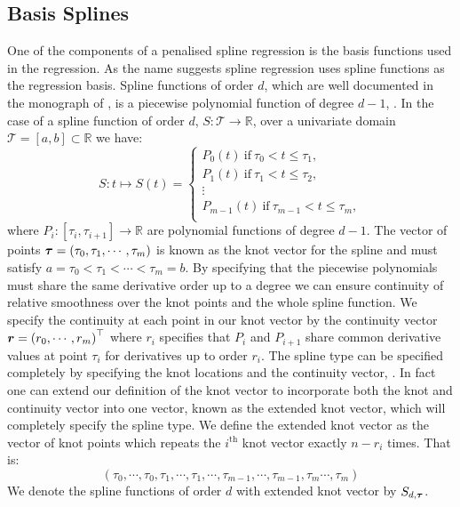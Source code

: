  \subsection{Basis Splines  \label{ssec:basis_splines}}
 One of the components of a penalised spline regression is the basis functions used in the regression.
 As the name suggests spline regression uses spline functions as the regression basis.
 Spline functions of order $d$,  which are well documented in the monograph of \citeauthor{de_boor_practical_2001}, is a piecewise polynomial function of degree $d-1$, \cite{de_boor_practical_2001}. In the case of a spline function of order $d$, $S: \mathcal{T} \to \mathbb{R}$, over a univariate domain $\mathcal{T} = \left[a, b\right] \subset \mathbb{R}$ we have: 
 \begin{equation}
 	S: t \mapsto S(t) = \begin{cases}
 		P_0(t)~\text{if}~ \tau_0 < t  \leq \tau_1,\\
 		P_1(t)~\text{if}~ \tau_1 < t  \leq \tau_2,\\
 		\vdots \\
 		P_{m-1}(t)~\text{if}~ \tau_{m-1} < t  \leq \tau_m,\\
 	\end{cases}
 \end{equation}
where $P_i: \left[\tau_i, \tau_{i+1}\right] \to \mathbb{R}$ are polynomial functions of degree $d-1$.
The vector of points $\bm{{\tau}} = \left(\tau_0, \tau_1, \cdots, \tau_m \right)$ is known as the knot vector for the spline and must satisfy $a=\tau_0 < \tau_1 < \cdots < \tau_m = b$.
 By specifying that the piecewise polynomials must share the same derivative order up to a degree we can ensure continuity of relative smoothness over the knot points and the whole spline function.
 We specify the continuity at each point in our knot vector by the continuity vector $\bm{{r}}=\left( r_0,\cdots, r_m \right)^\top$ where $r_i$ specifies that $P_i$ and $P_{i+1}$ share common derivative values at point $\tau_i$ for derivatives up to order $r_i$.
 The spline type can be specified completely by specifying the knot locations and the continuity vector, \citep{de_boor_practical_2001}.
 In fact one can extend our definition of the knot vector to incorporate both the knot and continuity vector into one vector, known as the extended knot vector, which will completely specify the spline type.
 We define the extended knot vector as the vector of knot points which repeats the $i^\text{th}$ knot vector exactly $n - r_i$ times. That is:
\begin{equation*}
	(\tau_0,\cdots,\tau_0, \tau_1, \cdots, \tau_1 ,\cdots, \tau_{m-1},\cdots, \tau_{m-1}, \tau_m \cdots, \tau_m)
\end{equation*}
We denote the spline functions of order $d$ with extended knot vector by $S_{d, \bm{{\tau}}}$. 

